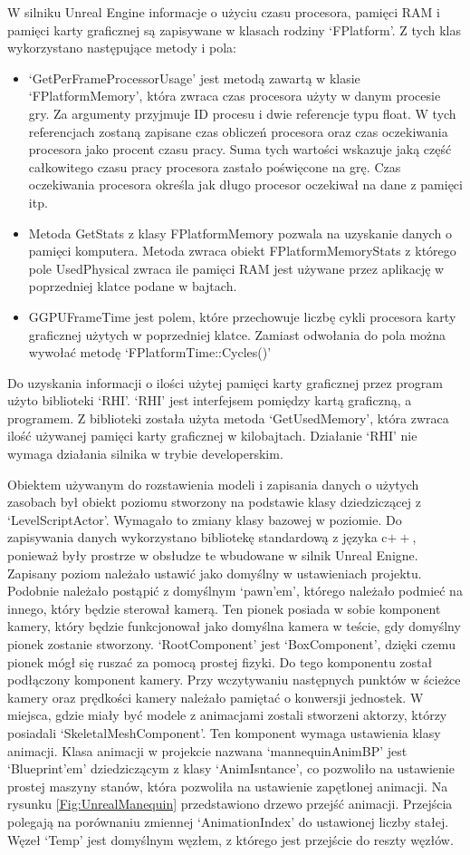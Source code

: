 \documentclass[12pt,twoside]{article}
\begin{document}
W silniku Unreal Engine informacje o użyciu czasu procesora, pamięci RAM i pamięci karty graficznej są zapisywane w klasach rodziny ‘FPlatform’. Z tych klas wykorzystano następujące metody i pola:
\begin{itemize}
\item ‘GetPerFrameProcessorUsage’ jest metodą zawartą w klasie
‘FPlatformMemory’, która zwraca czas procesora użyty w danym procesie gry. Za
argumenty przyjmuje ID procesu i dwie referencje typu float. W tych referencjach
zostaną zapisane czas obliczeń procesora oraz czas oczekiwania procesora jako
procent czasu pracy. Suma tych wartości wskazuje jaką część całkowitego czasu
pracy procesora zastało poświęcone na grę. Czas oczekiwania procesora określa
jak długo procesor oczekiwał na dane z pamięci itp. 
\item Metoda GetStats z klasy FPlatformMemory pozwala na uzyskanie danych o
pamięci komputera. Metoda zwraca obiekt FPlatformMemoryStats z którego pole
UsedPhysical zwraca ile pamięci RAM jest używane przez aplikację w poprzedniej
klatce podane w bajtach. 
\item GGPUFrameTime jest polem, które przechowuje liczbę cykli procesora karty
graficznej użytych w poprzedniej klatce. Zamiast odwołania do pola można wywołać
metodę ‘FPlatformTime::Cycles()’
\end{itemize}
Do uzyskania informacji o ilości użytej pamięci karty graficznej przez program
użyto biblioteki ‘RHI’. ‘RHI’ jest interfejsem pomiędzy kartą graficzną, a
programem. Z biblioteki została użyta metoda ‘GetUsedMemory’, która zwraca ilość
używanej pamięci karty graficznej w kilobajtach. Działanie ‘RHI’ nie wymaga
działania silnika w trybie developerskim. 

Obiektem używanym do rozstawienia modeli i zapisania danych o użytych zasobach
był obiekt poziomu stworzony na podstawie klasy dziedziczącej z
‘LevelScriptActor’. Wymagało to zmiany klasy bazowej w poziomie. Do zapisywania
danych wykorzystano bibliotekę standardową z języka c$++$, ponieważ były
prostrze w obsłudze te wbudowane w silnik Unreal Enigne. Zapisany poziom
należało ustawić jako domyślny w ustawieniach projektu. Podobnie należało
postąpić z domyślnym ‘pawn’em’, którego należało podmieć na innego, który będzie
sterował kamerą. Ten pionek posiada w sobie komponent kamery, który będzie
funkcjonował jako domyślna kamera w teście, gdy domyślny pionek zostanie
stworzony. ‘RootComponent’ jest ‘BoxComponent’, dzięki czemu pionek mógł się
ruszać za pomocą prostej fizyki. Do tego komponentu został podłączony komponent
kamery. Przy wczytywaniu następnych punktów w ścieżce kamery oraz prędkości
kamery należało pamiętać o konwersji jednostek. W miejsca, gdzie miały być
modele z animacjami zostali stworzeni aktorzy, którzy posiadali
‘SkeletalMeshComponent’. Ten komponent wymaga ustawienia klasy animacji. Klasa
animacji w projekcie nazwana ‘mannequinAnimBP’ jest ‘Blueprint’em’ dziedziczącym
z klasy ‘AnimIsntance’, co pozwoliło na ustawienie prostej maszyny stanów, która
pozwoliła na ustawienie zapętlonej animacji. 
Na rysunku \ref{Fig:UnrealManequin} przedstawiono drzewo przejść animacji.
Przejścia polegają na porównaniu zmiennej ‘AnimationIndex’ do ustawionej liczby
stałej. Węzeł ‘Temp’ jest domyślnym węzłem, z którego jest przejście do reszty
węzłów. 
\end{document}

